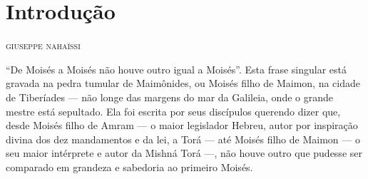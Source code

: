 %
%
%
%

\chapter{Introdução}

\begin{flushright}
\textsc{giuseppe nahaïssi}
\end{flushright}

\noindent{}``De Moisés a Moisés não houve outro igual a Moisés''. Esta frase
singular está gravada na pedra tumular de Maimônides, ou Moisés filho
de Maimon, na cidade de Tiberíades --- não longe das margens do mar da
Galileia, onde o grande mestre está sepultado. Ela foi escrita por
seus discípulos querendo dizer que, desde Moisés filho de Amram --- o
maior legislador Hebreu, autor por inspiração divina dos dez mandamentos
e da lei, a Torá --- até Moisés filho de Maimon --- o seu maior
intérprete e autor da Mishná Torá ---, não houve outro que
pudesse ser comparado em grandeza e sabedoria ao primeiro Moisés.

